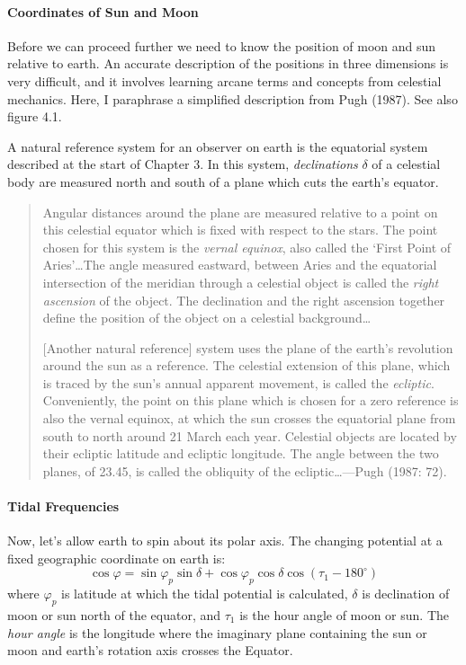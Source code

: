 \paragraph{Coordinates of Sun and Moon}
Before we can proceed further we need to know
the position of moon and sun relative to earth. An accurate description of the positions in
three dimensions is very difficult, and it involves learning arcane terms and concepts from
celestial mechanics. Here, I paraphrase a simplified description from Pugh (1987). See also
figure 4.1.

A natural reference system for an observer on earth is the equatorial system described at the
start of Chapter 3. In this system, \textit{declinations} $\delta$
of a celestial body are measured north and south of a plane which cuts the earth's equator.
\begin{quotation} \small
Angular distances around the plane are measured relative to
a point on this celestial equator which is fixed with respect to the stars. The
point chosen for this system is the \textit{vernal equinox}, also called the `First
Point of Aries'\dots The angle measured eastward, between Aries and the equatorial
intersection of the meridian through a celestial object is called the \textit{right
ascension} of the object. The declination and the right ascension together define
the position of the object on a celestial background\dots

[Another natural reference] system uses the plane of the earth's revolution around
the sun as a reference. The celestial extension of this plane, which is traced by
the sun's annual apparent movement, is called the \textit{ecliptic}. Conveniently,
the point on this plane which is chosen for a zero reference is also the vernal
equinox, at which the sun crosses the equatorial plane from south to north around 21
March each year. Celestial objects are located by their ecliptic latitude and
ecliptic longitude. The angle between the two planes, of 23.45\degrees, is called
the obliquity of the ecliptic\dots ---Pugh (1987: 72).
\end{quotation}

\paragraph{Tidal Frequencies}
Now, let's allow earth to spin about its polar axis. The
changing potential at a fixed geographic coordinate on earth is:
\begin{equation}
\cos \varphi = \sin \varphi _p \sin \delta + \cos \varphi _p \cos \delta \cos (\tau
_{1} - 180^{\circ})
\end{equation}
where $\varphi _p$ is latitude at which the tidal potential is calculated, $\delta $
is declination of moon or sun north of the equator, and $\tau _{1}$ is the hour angle of moon
or sun. The \textit{hour angle}
 is the longitude where the imaginary plane containing the sun or moon and
earth's rotation axis crosses the Equator.

